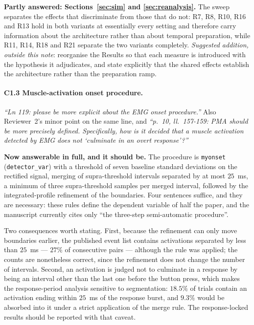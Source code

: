 \documentclass[a4paper,11pt]{article}
\newcommand{\1}{\mathbbm{1}}
\begin{document}
\textbf{Partly answered: Sections~\ref{sec:sim} and \ref{sec:reanalysis}.} The sweep separates
the effects that discriminate from those that do not: R7, R8, R10, R16 and R13 hold in
both variants at essentially every setting and therefore carry information about the
architecture rather than about temporal preparation, while R11, R14, R18 and R21 separate the two
variants completely. \emph{Suggested addition, outside this note}: reorganise the
Results so that each measure is introduced with the hypothesis it adjudicates, and state
explicitly that the shared effects establish the architecture rather than the
preparation ramp.

\paragraph{C1.3 Muscle-activation onset procedure.}
\emph{``Ln 119: please be more explicit about the EMG onset procedure.''} Also
Reviewer~2's minor point on the same line, and \emph{``p.~10, ll.~157-159: PMA should be
more precisely defined. Specifically, how is it decided that a muscle activation
detected by EMG does not `culminate in an overt response'?''}

\textbf{Now answerable in full, and it should be.} The procedure is \texttt{myonset}
(\texttt{detector\_var}) with a threshold of seven baseline standard deviations on the
rectified signal, merging of supra-threshold intervals separated by at most $25$~ms, a
minimum of three supra-threshold samples per merged interval, followed by the
integrated-profile refinement of the boundaries. Four sentences suffice, and they are
necessary: these rules define the dependent variable of half the paper, and the
manuscript currently cites only ``the three-step semi-automatic procedure''.

Two consequences worth stating. First, because the refinement can only move boundaries
earlier, the published event list contains activations separated by less than $25$~ms
--- $27\%$ of consecutive pairs --- although the rule was applied; the counts are
nonetheless correct, since the refinement does not change the number of intervals.
Second, an activation is judged not to culminate in a response by being an interval
other than the last one before the button press, which makes the response-period
analysis sensitive to segmentation: $18.5\%$ of trials contain an activation ending
within $25$~ms of the response burst, and $9.3\%$ would be absorbed into it under a
strict application of the merge rule. The response-locked results should be reported with that caveat.
\end{document}
